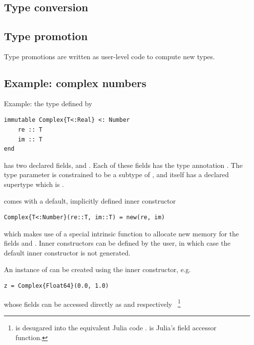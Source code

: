 \documentclass[pldi]{sigplanconf-pldi15}
\begin{document}
\subsection{Type conversion}



\subsection{Type promotion}

Type promotions are written as user-level code to compute new types.



\subsection{Example: complex numbers}

Example: the  type defined by

\begin{lstlisting}
immutable Complex{T<:Real} <: Number
    re :: T
    im :: T
end
\end{lstlisting}
%
has two declared fields,  and . Each of these fields has the
type annotation . The type parameter  is constrained to be a
subtype of , and  itself has a declared supertype
which is .

 comes with a default, implicitly defined inner constructor

\begin{lstlisting}
Complex{T<:Number}(re::T, im::T) = new(re, im)
\end{lstlisting}
%
which makes use of a special intrinsic function  to allocate new
memory for the fields  and . Inner constructors can be
defined by the user, in which case the default inner constructor is not
generated.

An instance of  can be created using the inner constructor, e.g.\

\begin{lstlisting}
z = Complex{Float64}(0.0, 1.0)
\end{lstlisting}
%

whose fields can be accessed directly as  and  
respectively~
\footnote{ is desugared into the equivalent Julia code .
 is Julia's field accessor function.}
\end{document}
